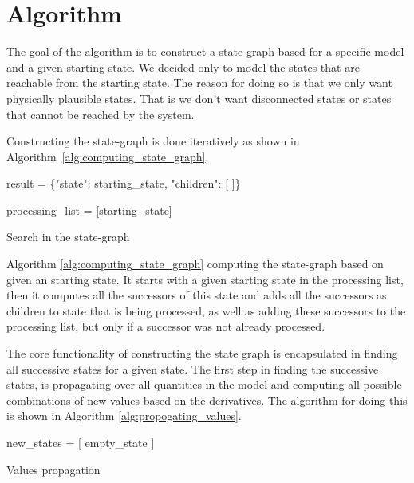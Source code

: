\documentclass[a4paper]{article}
\begin{document}
\section{Algorithm}
The goal of the algorithm is to construct a state graph based for a specific model and a given starting state. We decided only to model the states that are reachable from the starting state. The reason for doing so is that we only want physically plausible states. That is we don't want disconnected states or states that cannot be reached by the system.

Constructing the state-graph is done iteratively as shown in Algorithm~\ref{alg:computing_state_graph}.

\vspace{12pt}
\begin{algorithm}[H]
    result = \{"state": starting\_state, "children": [ ]\}

    processing\_list = [starting\_state]

\caption{Search in the state-graph}
\label{alg:computing_state_graph}
\end{algorithm}
\vspace{12pt}

Algorithm \ref{alg:computing_state_graph} computing the state-graph based on given an starting state. It starts with a given starting state in the processing list, then it computes all the successors of this state and adds all the successors as children to state that is being processed, as well as adding these successors to the processing list, but only if a successor was not already processed.

The core functionality of constructing the state graph is encapsulated in finding all successive states for a given state. The first step in finding the successive states, is propagating over all quantities in the model and computing all possible combinations of new values based on the derivatives. The algorithm for doing this is shown in Algorithm \ref{alg:propogating_values}.

\vspace{12pt}
\begin{algorithm}[H]
new\_states = [ empty\_state ]

\caption{Values propagation}
\label{alg:propogating_values}
\end{algorithm}
\vspace{12pt}
\end{document}
